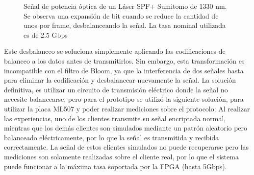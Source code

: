 \begin{figure}[!t]
   \centering
   \qquad
   \qquad
  \caption {Señal de potencia óptica de un Láser SPF+ Sumitomo de 1330 nm. Se observa una expansión de bit cuando se reduce la cantidad de unos por frame, desbalanceando la señal. La tasa nominal utilizada es de 2.5 Gbps}
  \label{fig:ImgExpansion}
\end{figure}

Este desbalanceo se soluciona simplemente aplicando las codificaciones de balanceo a los datos antes de transmitirlos. Sin embargo, esta transformación es incompatible con el filtro de Bloom, ya que la interferencia de dos señales basta para eliminar la codificación y desbalancear nuevamente la señal. La solución definitiva, es utilizar un circuito de transmisión eléctrico donde la señal no necesite balancearse, pero para el prototipo se utilizó la siguiente solución, para utilizar la placa ML507 y poder  realizar mediciones sobre el protocolo: Al realizar las experiencias, uno de los clientes transmite su señal encriptada normal, mientras que los demás clientes son simulados mediante un patrón aleatorio pero balanceado eléctricamente, por lo que la señal es transmitida y recibida correctamente. La señal de estos clientes simulados no puede recuperarse pero las mediciones son solamente realizadas sobre el cliente real, por lo que el sistema puede funcionar a la máxima tasa soportada por la FPGA (hasta 5Gbps).

